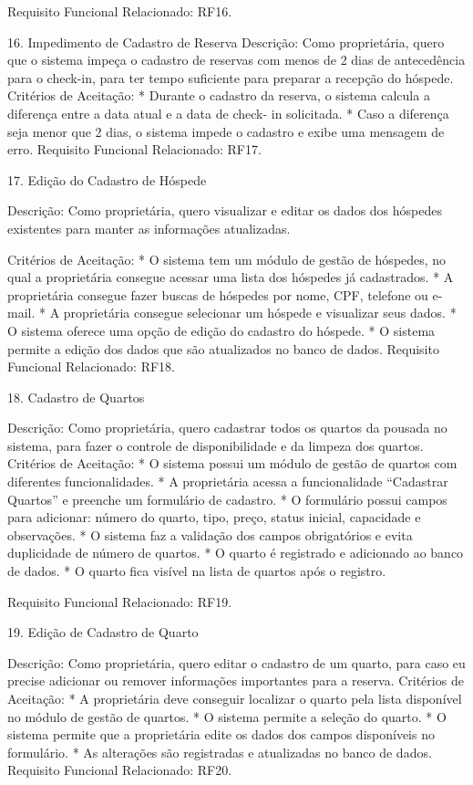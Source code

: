 Requisito Funcional Relacionado: RF16.


16. Impedimento de Cadastro de Reserva 
Descrição: Como proprietária, quero que o sistema impeça o cadastro de reservas com menos de  2 dias de antecedência para o check-in, para ter tempo suficiente para preparar a recepção do hóspede.
Critérios de Aceitação:
* Durante o cadastro da reserva, o sistema calcula a diferença entre a data atual e a data de check- in solicitada.
* Caso a diferença seja menor que 2 dias, o sistema impede o cadastro e exibe uma mensagem de erro.
Requisito Funcional Relacionado: RF17.


17. Edição do Cadastro de Hóspede


Descrição: Como proprietária, quero visualizar e editar os dados dos hóspedes existentes para manter as informações atualizadas.


Critérios de Aceitação:
* O sistema tem um módulo de gestão de hóspedes, no qual a proprietária consegue acessar uma lista dos hóspedes já cadastrados.
* A proprietária consegue fazer buscas de hóspedes por nome, CPF, telefone ou e-mail.
* A proprietária consegue selecionar um hóspede e visualizar seus dados.
* O sistema oferece uma opção de edição do cadastro do hóspede.
* O sistema permite a edição dos dados que são atualizados no banco de dados.
Requisito Funcional Relacionado: RF18.


18. Cadastro de Quartos


Descrição: Como proprietária, quero cadastrar todos os quartos da pousada no sistema, para fazer o controle de disponibilidade e da limpeza dos quartos.
Critérios de Aceitação:
* O sistema possui um módulo de gestão de quartos com diferentes funcionalidades.
* A proprietária acessa a funcionalidade “Cadastrar Quartos” e preenche um formulário de cadastro.
* O formulário possui campos para adicionar: número do quarto, tipo, preço, status inicial, capacidade e observações.
* O sistema faz a validação dos campos obrigatórios e evita duplicidade de número de quartos.
* O quarto é registrado e adicionado ao banco de dados.
* O quarto fica visível na lista de quartos após o registro.


Requisito Funcional Relacionado: RF19.




19. Edição de Cadastro de Quarto


Descrição: Como proprietária, quero editar o cadastro de um quarto, para caso eu precise adicionar ou remover informações importantes para a reserva.
Critérios de Aceitação:
*  A proprietária deve conseguir localizar o quarto pela lista disponível no módulo de gestão de quartos.
* O sistema permite a seleção do quarto.
* O sistema permite que a proprietária edite os dados dos campos disponíveis no formulário.
* As alterações são registradas e atualizadas no banco de dados.
Requisito Funcional Relacionado: RF20.


